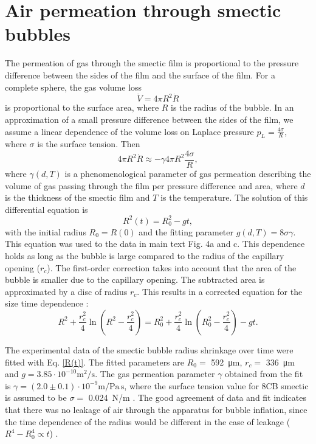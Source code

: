 \documentclass[a4paper,12pt]{article}
\begin{document}
\section{Air permeation through smectic bubbles}
The permeation of gas through the smectic film is proportional to the pressure difference between the sides of the film and the surface of the film. For a complete sphere, the gas volume loss
\begin{equation}
	\dot{V}=4\pi R^2 \dot{R}
\end{equation}
is proportional to the surface area, where $R$ is the radius of the bubble. In an approximation of a small pressure difference between the sides of the film, we assume a linear dependence of the volume loss on Laplace pressure $p_L=\frac{4 \sigma}{R}$, where $\sigma$ is the surface tension. Then
\begin{equation}
	4\pi R^2 \dot{R} \approx -\gamma 4\pi R^2 \frac{4 \sigma}{R},
\end{equation}
where $\gamma(d,T)$ is a phenomenological parameter of gas permeation describing the volume of gas passing through the film per pressure difference and area, where $d$ is the thickness of the smectic film and $T$ is the temperature. The solution of this differential equation is
\begin{equation}
	R^2(t) = R_0^2 - gt, \label{R(t)_approx}
\end{equation}
with the initial radius $R_0=R(0)$ and the fitting parameter $g(d,T)=8\sigma\gamma $. This equation was used to the data in main text Fig. 4a and c. This dependence holds as long as the bubble is large compared to the radius of the capillary opening ($r_c$). The first-order correction takes into account  that the area of the bubble is smaller due to the capillary opening. The subtracted area is approximated by a disc of radius $r_c$.
This results in a corrected equation for the size time dependence \cite{li2002gas}:
\begin{equation}
	R^2+\frac{r_c^2}{4}\ln{\left(R^2-\frac{r_c^2}{4}\right)}=R_0^2+\frac{r_c^2}{4}\ln{\left(R_0^2-\frac{r_c^2}{4}\right)}-gt.
	\label{R(t)}
\end{equation}

The experimental data of the smectic bubble radius shrinkage over time were fitted with Eq. \eqref{R(t)}.  The fitted parameters are $R_0=$ \SI{592}{\um}, $r_c=$ \SI{336}{\um} and $g=3.85\cdot 10^{-10} \mathrm{m^2/s}$. The gas permeation parameter $\gamma$ obtained from the fit is $\gamma=(2.0\pm0.1)\cdot 10^{-9} \mathrm{m/Pa\,s}$, where the surface tension value for 8CB smectic is assumed to be $\sigma=$ \SI{0.024}{N/m} \cite{stannarius1997surface}.
The good agreement of data and fit indicates that there was no leakage of air through the apparatus for bubble inflation, since the time dependence of the radius would be different in the case of leakage ($R^4 - R_0^4 \propto t$) \cite{li2002gas}.
\end{document}
